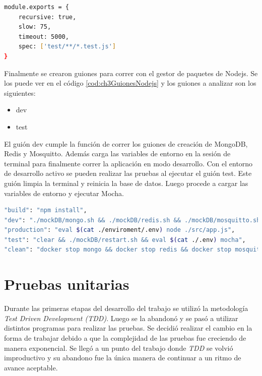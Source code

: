 \begin{lstlisting}[language=bash,label=cod:ch3ConfiguraciónMocha,caption=Configuración de Mocha.]
module.exports = {
    recursive: true,
    slow: 75,
    timeout: 5000,
    spec: ['test/**/*.test.js']
}
\end{lstlisting}

Finalmente se crearon guiones para correr con el gestor de paquetes de Nodejs.
Se los puede ver en el código \ref{cod:ch3GuionesNodejs} y los guiones a analizar son los siguientes:

\begin{itemize}
	\item dev
	\item test
\end{itemize}

El guión dev cumple la función de correr los guiones de creación de MongoDB, Redis y Mosquitto.
Además carga las variables de entorno en la sesión de terminal para finalmente correr la aplicación en modo desarrollo.
Con el entorno de desarrollo activo se pueden realizar las pruebas al ejecutar el guión test.
Este guión limpia la terminal y reinicia la base de datos. Luego procede a cargar las variables de entorno y ejecutar Mocha.

\begin{lstlisting}[language=bash,label=cod:ch3GuionesNodejs,caption=Guiones de Nodejs.]
"build": "npm install",
"dev": "./mockDB/mongo.sh && ./mockDB/redis.sh && ./mockDB/mosquitto.sh && eval $(cat ./.env) nodemon ./src/app.js",
"production": "eval $(cat ./enviroment/.env) node ./src/app.js",
"test": "clear && ./mockDB/restart.sh && eval $(cat ./.env) mocha",
"clean": "docker stop mongo && docker stop redis && docker stop mosquitto"
\end{lstlisting}

\section{Pruebas unitarias}
Durante las primeras etapas del desarrollo del trabajo se utilizó la metodología \emph{Test Driven Development (TDD)}.
Luego se la abandonó y se pasó a utilizar distintos programas para realizar las pruebas.
Se decidió realizar el cambio en la forma de trabajar debido a que la complejidad de las pruebas fue creciendo de manera exponencial.
Se llegó a un punto del trabajo donde \emph{TDD} se volvió improductivo y su abandono fue la única manera de continuar a un ritmo de avance aceptable.

